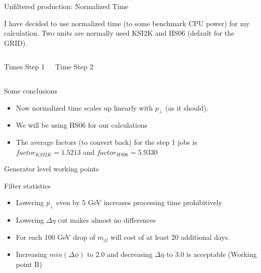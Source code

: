 \documentclass[8pt]{beamer}
\begin{document}
\begin{frame}{Unfiltered production: Normalized Time}
 
I have decided to use normalized time (to some benchmark CPU power) for my calculation. Two units are normally used KSI2K and HS06 (default for the GRID).
 
\begin{columns}

  \centering

  \begin{block}{Times Step 1}
  
  \end{block}
  
  \centering
  
  \begin{block}{Time Step 2}
  
  \end{block}

\end{columns}

Some conclusions
\begin{itemize}
  \item Now normalized time scales up linearly with $p_\perp$ (as it should). 
  \item We will be using HS06 for our calculations
  \item The average factors (to convert back) for the step 1 jobs is $factor_{KSI2K}=1.5213$ and $factor_{HS06}=5.9330$
\end{itemize}


\end{frame}

\begin{frame}{Generator level working points}

\begin{block}{Filter statistics}

  \centering
  
  
\end{block}

\begin{itemize}
  \item Lowering $p_\perp$ even by 5 GeV increases processing time prohibitively 
  \item Lowering $\Delta\eta$ cut makes almost no differences
  \item For each 100 GeV drop of $m_{jj}$ will cost of at least 20 additional days. 
  \item Increasing $min(\Delta\phi)$ to 2.0 and decreasing $\Delta\eta$ to 3.0 is acceptable (Working point B)
\end{itemize}

\end{frame}
\end{document}
